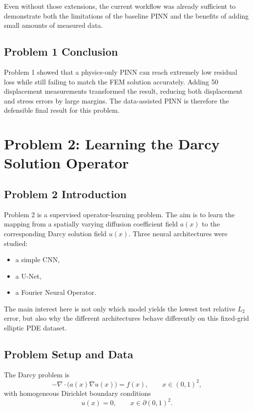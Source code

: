 \documentclass[11pt]{article}
\begin{document}
Even without those extensions, the current workflow was already sufficient to demonstrate both the limitations of the baseline PINN and the benefits of adding small amounts of measured data.

\subsection*{Problem 1 Conclusion}

Problem 1 showed that a physics-only PINN can reach extremely low residual loss while still failing to match the FEM solution accurately. Adding 50 displacement measurements transformed the result, reducing both displacement and stress errors by large margins. The data-assisted PINN is therefore the defensible final result for this problem.

\clearpage

\section{Problem 2: Learning the Darcy Solution Operator}

\subsection*{Problem 2 Introduction}

Problem 2 is a supervised operator-learning problem. The aim is to learn the mapping from a spatially varying diffusion coefficient field \(a(x)\) to the corresponding Darcy solution field \(u(x)\). Three neural architectures were studied:
\begin{itemize}[itemsep=0.25em]
    \item a simple CNN,
    \item a U-Net,
    \item a Fourier Neural Operator.
\end{itemize}

The main interest here is not only which model yields the lowest test relative \(L_2\) error, but also why the different architectures behave differently on this fixed-grid elliptic PDE dataset.

\subsection*{Problem Setup and Data}

The Darcy problem is
\[
-\nabla \cdot \big(a(x)\nabla u(x)\big) = f(x), \qquad x \in (0,1)^2,
\]
with homogeneous Dirichlet boundary conditions
\[
u(x) = 0, \qquad x \in \partial(0,1)^2.
\]
\end{document}
